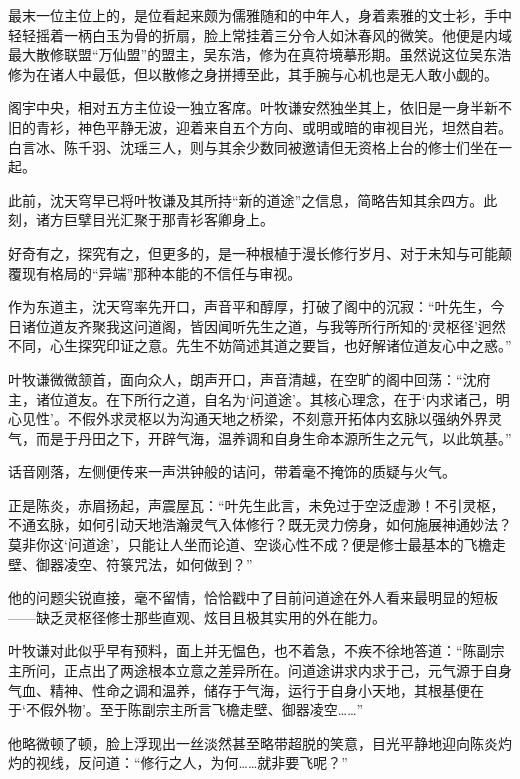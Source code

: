 最末一位主位上的，是位看起来颇为儒雅随和的中年人，身着素雅的文士衫，手中轻轻摇着一柄白玉为骨的折扇，脸上常挂着三分令人如沐春风的微笑。他便是内域最大散修联盟“万仙盟”的盟主，吴东浩，修为在真符境摹形期。虽然说这位吴东浩修为在诸人中最低，但以散修之身拼搏至此，其手腕与心机也是无人敢小觑的。

阁宇中央，相对五方主位设一独立客席。叶牧谦安然独坐其上，依旧是一身半新不旧的青衫，神色平静无波，迎着来自五个方向、或明或暗的审视目光，坦然自若。白言冰、陈千羽、沈瑶三人，则与其余少数同被邀请但无资格上台的修士们坐在一起。

此前，沈天穹早已将叶牧谦及其所持“新的道途”之信息，简略告知其余四方。此刻，诸方巨擘目光汇聚于那青衫客卿身上。

好奇有之，探究有之，但更多的，是一种根植于漫长修行岁月、对于未知与可能颠覆现有格局的“异端”那种本能的不信任与审视。

\vspace{2em}

作为东道主，沈天穹率先开口，声音平和醇厚，打破了阁中的沉寂：“叶先生，今日诸位道友齐聚我这问道阁，皆因闻听先生之道，与我等所行所知的‘灵枢径’迥然不同，心生探究印证之意。先生不妨简述其道之要旨，也好解诸位道友心中之惑。”

叶牧谦微微颔首，面向众人，朗声开口，声音清越，在空旷的阁中回荡：“沈府主，诸位道友。在下所行之道，自名为‘问道途’。其核心理念，在于‘内求诸己，明心见性’。不假外求灵枢以为沟通天地之桥梁，不刻意开拓体内玄脉以强纳外界灵气，而是于丹田之下，开辟气海，温养调和自身生命本源所生之元气，以此筑基。”

话音刚落，左侧便传来一声洪钟般的诘问，带着毫不掩饰的质疑与火气。

正是陈炎，赤眉扬起，声震屋瓦：“叶先生此言，未免过于空泛虚渺！不引灵枢，不通玄脉，如何引动天地浩瀚灵气入体修行？既无灵力傍身，如何施展神通妙法？莫非你这‘问道途’，只能让人坐而论道、空谈心性不成？便是修士最基本的飞檐走壁、御器凌空、符箓咒法，如何做到？”

他的问题尖锐直接，毫不留情，恰恰戳中了目前问道途在外人看来最明显的短板——缺乏灵枢径修士那些直观、炫目且极其实用的外在能力。

叶牧谦对此似乎早有预料，面上并无愠色，也不着急，不疾不徐地答道：“陈副宗主所问，正点出了两途根本立意之差异所在。问道途讲求内求于己，元气源于自身气血、精神、性命之调和温养，储存于气海，运行于自身小天地，其根基便在于‘不假外物’。至于陈副宗主所言飞檐走壁、御器凌空……”

他略微顿了顿，脸上浮现出一丝淡然甚至略带超脱的笑意，目光平静地迎向陈炎灼灼的视线，反问道：“修行之人，为何……就非要飞呢？”

